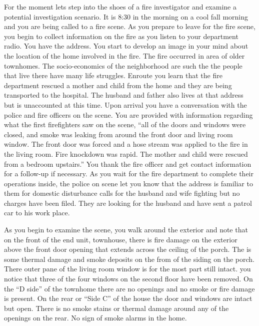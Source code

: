 \documentclass[twoside]{uocthesis}
\begin{document}
{For the moment lets step into the shoes of a fire investigator and examine a potential investigation scenario.  It is 8:30 in the morning on a cool fall morning and you are being called to a fire scene.  As you prepare to leave for the fire scene, you begin to collect information on the fire as you listen to your department radio.  You have the address.  You start to develop an image in your mind about the location of the home involved in the fire. The fire occurred in area of older townhomes.  The socio-economics of the neighborhood are such the the people that live there have many life struggles. Enroute you learn that the fire department rescued a mother and child from the home and they are being transported to the hospital.  The husband and father also lives at that address but is unaccounted at this time.  Upon arrival you have a conversation with the police and fire officers on the scene.  You are provided with information regarding what the first firefighters saw on the scene, ``all of the doors and windows were closed, and smoke was leaking from around the front door and living room window.  The front door was forced and a hose stream was applied to the fire in the living room.  Fire knockdown was rapid.  The mother and child were rescued from a bedroom upstairs.''  You thank the fire officer and get contact information for a follow-up if necessary.  As you wait for the fire department to complete their operations inside, the police on scene let you know that the address is familiar to them for domestic disturbance calls for the husband and wife fighting but no charges have been filed.  They are looking for the husband and have sent a patrol car to his work place.  

As you begin to examine the scene, you walk around the exterior and note that on the front of the end unit, townhouse, there is fire damage on the exterior above the front door opening that extends across the ceiling of the porch.  The is some thermal damage and smoke deposits on the from of the siding on the porch.  There outer pane of the living room window is for the most part still intact. you notice that three of the four windows on the second floor have been removed.  On the ``D side'' of the townhome there are no openings and no smoke or fire damage is present.  On the rear or ``Side C'' of the house the door and windows are intact but open.  There is no smoke stains or thermal damage around any of the openings on the rear. No sign of smoke alarms in the home.

}
\end{document}
